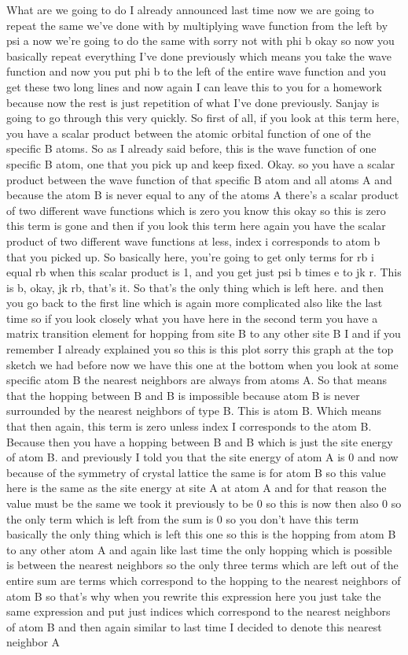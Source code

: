What are we going to do I already announced last time now we are going to repeat the same we've done with by multiplying wave function from the left by psi a now we're going to do the same with sorry not with phi b okay so now you basically repeat everything I've done previously which means you take the wave function and now you put phi b to the left of the entire wave function and you get these two long lines and now again I can leave this to you for a homework because now the rest is just repetition of what I've done previously. Sanjay is going to go through this very quickly. So first of all, if you look at this term here, you have a scalar product between the atomic orbital function of one of the specific B atoms. So as I already said before, this is the wave function of one specific B atom, one that you pick up and keep fixed. Okay. so you have a scalar product between the wave function of that specific B atom and all atoms A and because the atom B is never equal to any of the atoms A there's a scalar product of two different wave functions which is zero you know this okay so this is zero this term is gone and then if you look this term here again you have the scalar product of two different wave functions at less, index i corresponds to atom b that you picked up. So basically here, you're going to get only terms for rb i equal rb when this scalar product is 1, and you get just psi b times e to jk r. This is b, okay, jk rb, that's it. So that's the only thing which is left here. and then you go back to the first line which is again more complicated also like the last time so if you look closely what you have here in the second term you have a matrix transition element for hopping from site B to any other site B I and if you remember I already explained you so this is this plot sorry this graph at the top sketch we had before now we have this one at the bottom when you look at some specific atom B the nearest neighbors are always from atoms A. So that means that the hopping between B and B is impossible because atom B is never surrounded by the nearest neighbors of type B. This is atom B. Which means that then again, this term is zero unless index I corresponds to the atom B. Because then you have a hopping between B and B which is just the site energy of atom B. and previously I told you that the site energy of atom A is 0 and now because of the symmetry of crystal lattice the same is for atom B so this value here is the same as the site energy at site A at atom A and for that reason the value must be the same we took it previously to be 0 so this is now then also 0 so the only term which is left from the sum is 0 so you don't have this term basically the only thing which is left this one so this is the hopping from atom B to any other atom A and again like last time the only hopping which is possible is between the nearest neighbors so the only three terms which are left out of the entire sum are terms which correspond to the hopping to the nearest neighbors of atom B so that's why when you rewrite this expression here you just take the same expression and put just indices which correspond to the nearest neighbors of atom B and then again similar to last time I decided to denote this nearest neighbor A 